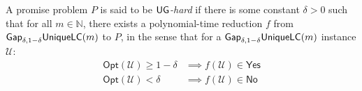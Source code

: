 \begin{definition}
  A promise problem $P$ is said to be \emph{$\mathsf{UG}$-hard} if there is some constant $\delta > 0$ such that for all $m \in \mathbb{N}$, there exists a polynomial-time reduction $f$ from $\mathsf{Gap}_{\delta, 1-\delta}\mathsf{UniqueLC}(m)$ to $P$, in the sense that for a $\mathsf{Gap}_{\delta, 1-\delta}\mathsf{UniqueLC}(m)$ instance $\mathcal{U}$:
  \begin{align*}
    \mathsf{Opt}(\mathcal{U})  \geq 1 - \delta & \implies f(\mathcal{U}) \in \mathsf{Yes} \\
    \mathsf{Opt}(\mathcal{U})  < \delta & \implies f(\mathcal{U}) \in \mathsf{No}
  \end{align*}
\end{definition}

